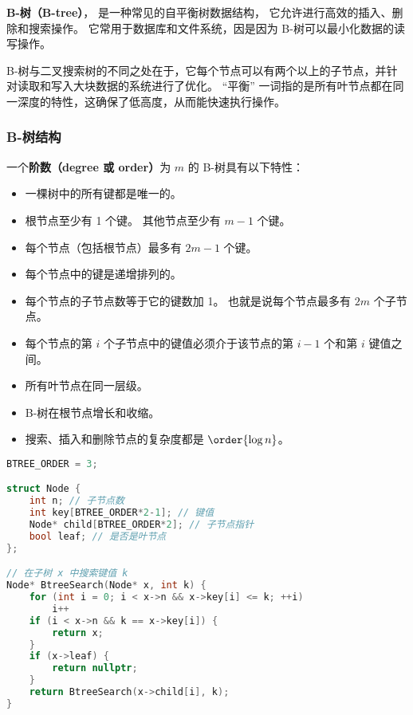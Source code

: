 
\begin{issues}
\issueDraft
\end{issues}


\textbf{B-树（B-tree）}， 是一种常见的自平衡树数据结构， 它允许进行高效的插入、删除和搜索操作。 它常用于数据库和文件系统，因是因为 B-树可以最小化数据的读写操作。

B-树与二叉搜索树的不同之处在于，它每个节点可以有两个以上的子节点，并针对读取和写入大块数据的系统进行了优化。 “平衡” 一词指的是所有叶节点都在同一深度的特性，这确保了低高度，从而能快速执行操作。

\subsubsection{B-树结构}
一个\textbf{阶数（degree 或 order）}为 $m$ 的 B-树具有以下特性：
\begin{itemize}
\item 一棵树中的所有键都是唯一的。
\item 根节点至少有 1 个键。 其他节点至少有 $m-1$ 个键。
\item 每个节点（包括根节点）最多有 $2m-1$ 个键。
\item 每个节点中的键是递增排列的。
\item 每个节点的子节点数等于它的键数加 1。 也就是说每个节点最多有 $2m$ 个子节点。
\item 每个节点的第 $i$ 个子节点中的键值必须介于该节点的第 $i-1$ 个和第 $i$ 键值之间。
\item 所有叶节点在同一层级。
\item B-树在根节点增长和收缩。
\item 搜索、插入和删除节点的复杂度都是 $\order{\log n}$。
\end{itemize}

\begin{lstlisting}[language=cpp]
BTREE_ORDER = 3;

struct Node {
    int n; // 子节点数
    int key[BTREE_ORDER*2-1]; // 键值
    Node* child[BTREE_ORDER*2]; // 子节点指针
    bool leaf; // 是否是叶节点
};

// 在子树 x 中搜索键值 k
Node* BtreeSearch(Node* x, int k) {
    for (int i = 0; i < x->n && x->key[i] <= k; ++i)
        i++
    if (i < x->n && k == x->key[i]) {
        return x;
    }
    if (x->leaf) {
        return nullptr;
    }
    return BtreeSearch(x->child[i], k);
}
\end{lstlisting}


